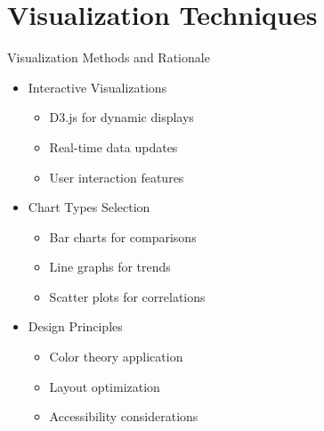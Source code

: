 \documentclass[aspectratio=169]{beamer}
\begin{document}
\section{Visualization Techniques}
\begin{frame}{Visualization Methods and Rationale}
    \begin{itemize}
        \item Interactive Visualizations
        \begin{itemize}
            \item D3.js for dynamic displays
            \item Real-time data updates
            \item User interaction features
        \end{itemize}
        \item Chart Types Selection
        \begin{itemize}
            \item Bar charts for comparisons
            \item Line graphs for trends
            \item Scatter plots for correlations
        \end{itemize}
        \item Design Principles
        \begin{itemize}
            \item Color theory application
            \item Layout optimization
            \item Accessibility considerations
        \end{itemize}
    \end{itemize}
\end{frame}
\end{document}
